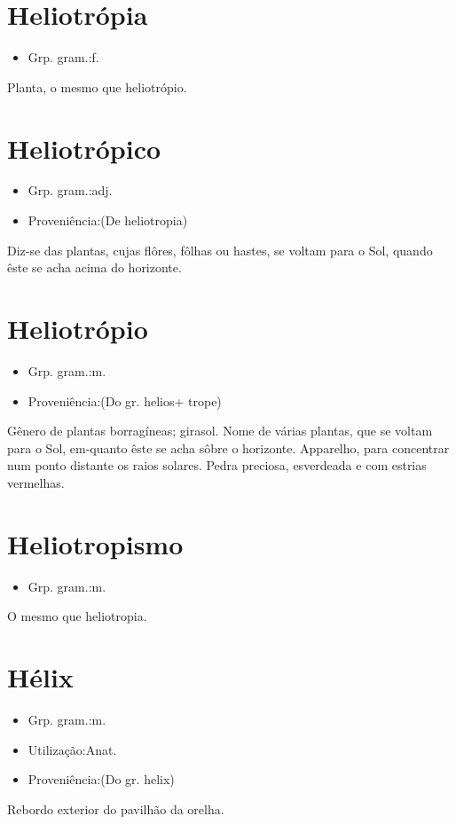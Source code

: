\documentclass{article}
\begin{document}
\section{Heliotrópia}
\begin{itemize}
\item {Grp. gram.:f.}
\end{itemize}
Planta, o mesmo que \textunderscore heliotrópio\textunderscore .
\section{Heliotrópico}
\begin{itemize}
\item {Grp. gram.:adj.}
\end{itemize}
\begin{itemize}
\item {Proveniência:(De \textunderscore heliotropia\textunderscore )}
\end{itemize}
Diz-se das plantas, cujas flôres, fôlhas ou hastes, se voltam para o Sol, quando êste se acha acima do horizonte.
\section{Heliotrópio}
\begin{itemize}
\item {Grp. gram.:m.}
\end{itemize}
\begin{itemize}
\item {Proveniência:(Do gr. \textunderscore helios\textunderscore  + \textunderscore trope\textunderscore )}
\end{itemize}
Gênero de plantas borragíneas; girasol.
Nome de várias plantas, que se voltam para o Sol, em-quanto êste se acha sôbre o horizonte.
Apparelho, para concentrar num ponto distante os raios solares.
Pedra preciosa, esverdeada e com estrias vermelhas.
\section{Heliotropismo}
\begin{itemize}
\item {Grp. gram.:m.}
\end{itemize}
O mesmo que \textunderscore heliotropia\textunderscore .
\section{Hélix}
\begin{itemize}
\item {Grp. gram.:m.}
\end{itemize}
\begin{itemize}
\item {Utilização:Anat.}
\end{itemize}
\begin{itemize}
\item {Proveniência:(Do gr. \textunderscore helix\textunderscore )}
\end{itemize}
Rebordo exterior do pavilhão da orelha.
\end{document}
